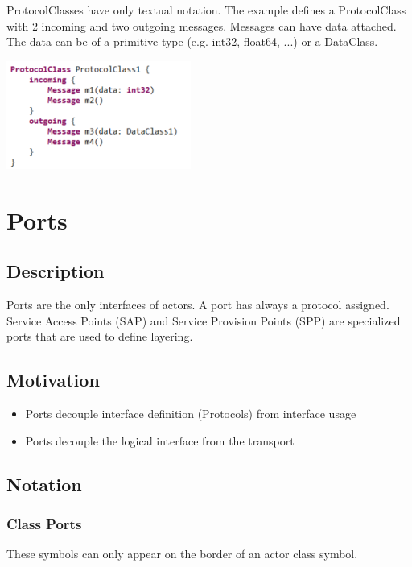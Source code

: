 ProtocolClasses have only textual notation. 
The example defines a ProtocolClass with 2 incoming and two outgoing messages. Messages can have data 
attached. The data can be of a primitive type (e.g. int32, float64, ...) or a DataClass.

\includegraphics{images/040-ProtocolClassTextualNotation.png}

\section{Ports}

\subsection{Description}

Ports are the only interfaces of actors. A port has always a protocol assigned. 
Service Access Points (SAP) and Service Provision Points (SPP) are specialized ports that are used to 
define layering.

\subsection{Motivation}

\begin{itemize}
\item Ports decouple interface definition (Protocols) from interface usage
\item Ports decouple the logical interface from the transport 
\end{itemize}

\subsection{Notation}

\subsubsection{Class Ports}

These symbols can only appear on the border of an actor class symbol. 

